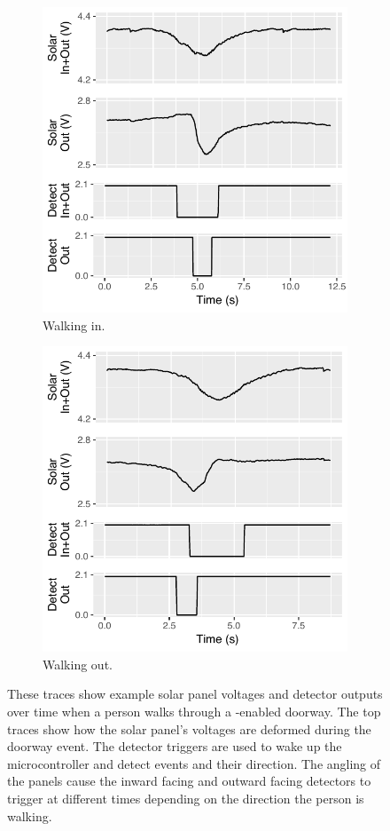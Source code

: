 \begin{figure}[t]
	\centering
	\begin{subfigure}[b]{0.5\textwidth}
		\centering
		\includegraphics[width=0.8\columnwidth]{figs/tracesin.pdf}
		\caption{Walking in.}
		\label{fig:tracesin}
	\end{subfigure}%
	\begin{subfigure}[b]{0.5\textwidth}
		\centering
		\includegraphics[width=0.8\columnwidth]{figs/tracesout.pdf}
		\caption{Walking out.}
		\label{fig:tracesout}
	\end{subfigure}
	\caption{These traces show example solar panel voltages and detector outputs over time when a person walks through a \sysname-enabled doorway. The top traces show how the solar panel's voltages are deformed during the doorway event. The detector triggers are used to wake up the microcontroller and detect events and their direction. The angling of the panels cause the inward facing and outward facing detectors to trigger at different times depending on the direction the person is walking.\label{fig:traces}}
\end{figure}

